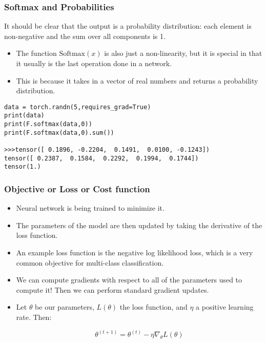 \begin{frame}[fragile]
\frametitle{Softmax and Probabilities}

It should be clear that the output is a probability distribution: each element is non-negative and the sum over all components is 1.

\begin{itemize}
\item The function $\text{Softmax}(x)$ is also just a non-linearity, but it is special in that it usually is the last operation done in a network. 
\item This is because it takes in a vector of real numbers and returns a probability distribution.
\end{itemize}
 \begin{lstlisting}
data = torch.randn(5,requires_grad=True)
print(data)
print(F.softmax(data,0))
print(F.softmax(data,0).sum())

>>>tensor([ 0.1896, -0.2204,  0.1491,  0.0100, -0.1243])
tensor([ 0.2387,  0.1584,  0.2292,  0.1994,  0.1744])
tensor(1.)
 \end{lstlisting}

\end{frame} 

\begin{frame}[fragile]
\frametitle{Objective or Loss or Cost function}

\begin{itemize}
\item Neural network is being trained to minimize it.
\item The parameters of the model are then updated by taking the derivative of the loss function. 
\item An example loss function is the negative log likelihood loss, which is a very common objective for multi-class classification.
\item We can compute gradients with respect to all of the parameters used to compute it! Then we can perform standard gradient updates.
\item Let $\theta$ be our parameters,  $L(\theta)$ the loss function, and $\eta$ a positive learning rate. Then:

$$ \theta^{(t+1)} = \theta^{(t)} - \eta \nabla_\theta L(\theta) $$
\end{itemize}

\end{frame} 

